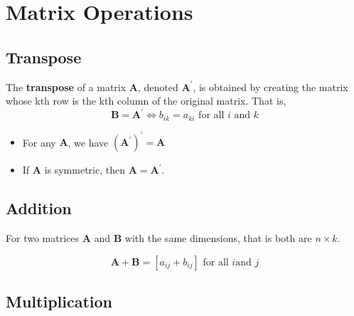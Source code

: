\documentclass[a4paper,11pt]{article}
\begin{document}
\section{Matrix Operations}
\label{sec:org8be46b1}

\subsection{Transpose}
\label{sec:orgef103b1}

The \textbf{transpose} of a matrix \(\mathbf{A}\), denoted
\(\mathbf{A}^{\prime}\), is obtained by creating the matrix whose kth
row is the kth column of the original matrix. That is,
\[ \mathbf{B} = \mathbf{A}^{\prime} \Leftrightarrow b_{ik} = a_{ki}
\text{ for all } i \text{ and } k \]

\begin{itemize}
\item For any \(\mathbf{A}\), we have \((\mathbf{A}^{\prime})^{\prime} = \mathbf{A}\)
\item If \(\mathbf{A}\) is symmetric, then \(\mathbf{A} = \mathbf{A}^{\prime}\).
\end{itemize}


\subsection{Addition}
\label{sec:org6cf8971}

For two matrices \(\mathbf{A}\) and \(\mathbf{B}\) with the same
dimensions, that is both are \(n \times k\). 

\[\mathbf{A} + \mathbf{B} = [a_{ij} + b_{ij}] \text{ for all } i \text{
and } j\]


\subsection{Multiplication}
\label{sec:org19fa8e6}
\end{document}

